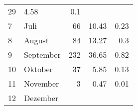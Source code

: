 \begin{longtable}{lXrrr}
       \num{29} &
       \num[round-mode=places,round-precision=2]{4.58} &
         \num[round-mode=places,round-precision=2]{0.1} \\

     7 &
     \multicolumn{1}{X}{ Juli   } &


       \num{66} &
       \num[round-mode=places,round-precision=2]{10.43} &
         \num[round-mode=places,round-precision=2]{0.23} \\

     8 &
     \multicolumn{1}{X}{ August   } &


       \num{84} &
       \num[round-mode=places,round-precision=2]{13.27} &
         \num[round-mode=places,round-precision=2]{0.3} \\

     9 &
     \multicolumn{1}{X}{ September   } &


       \num{232} &
       \num[round-mode=places,round-precision=2]{36.65} &
         \num[round-mode=places,round-precision=2]{0.82} \\

     10 &
     \multicolumn{1}{X}{ Oktober   } &


       \num{37} &
       \num[round-mode=places,round-precision=2]{5.85} &
         \num[round-mode=places,round-precision=2]{0.13} \\

     11 &
     \multicolumn{1}{X}{ November   } &


       \num{3} &
       \num[round-mode=places,round-precision=2]{0.47} &
         \num[round-mode=places,round-precision=2]{0.01} \\

     12 &
     \multicolumn{1}{X}{ Dezember   } &



\end{longtable}
